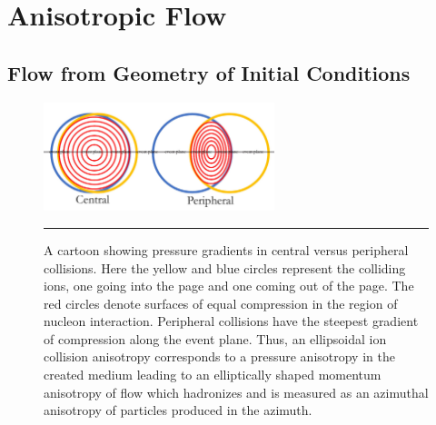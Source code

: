 
\chapter{Anisotropic Flow} %
\label{sect:flow}
\section{Flow from Geometry of Initial Conditions}
\begin{figure}[htbp!]
  \centering
    \includegraphics[width=0.6\textwidth]{Figures/pressuregradientsvscent.jpg}
    
        \rule{35em}{0.5pt}
  \caption[A cartoon showing pressure gradients in central versus peripheral collisions.]{A cartoon showing pressure gradients in central versus peripheral collisions. Here the yellow and blue circles represent the colliding ions, one going into the page and one coming out of the page. The red circles denote surfaces of equal compression in the region of nucleon interaction. Peripheral collisions have the steepest gradient of compression along the event plane. Thus, an ellipsoidal ion collision anisotropy corresponds to a pressure anisotropy in the created medium leading to an elliptically shaped momentum anisotropy of flow which hadronizes and is measured as an azimuthal anisotropy of particles produced in the azimuth.}
  \label{fig:pressuregradients}
\end{figure}


